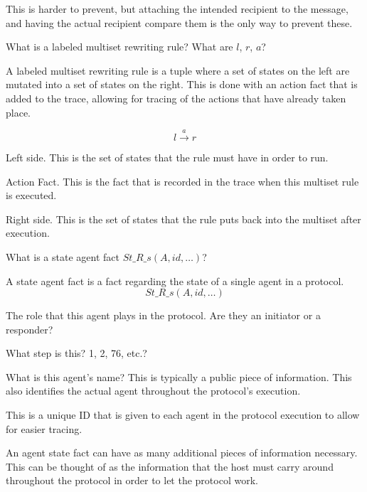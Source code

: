 \begin{questions}
\begin{solution}
    This is harder to prevent, but attaching the intended recipient to the message, and having the actual recipient compare them is the only way to prevent these.
  \end{solution}

\question{} What is a labeled multiset rewriting rule? What are $l$, $r$, $a$?
  \begin{solution}
    A labeled multiset rewriting rule is a tuple where a set of states on the left are mutated into a set of states on the right.
    This is done with an action fact that is added to the trace, allowing for tracing of the actions that have already taken place.

    \begin{equation}\label{eq:Labeled_Multiset_Rewriting_Rule}
      l \overset{a}{\to} r
    \end{equation}
    \begin{description}[noitemsep]
    \item[$l$] Left side. This is the set of states that the rule must have in order to run.
    \item[$a$] Action Fact. This is the fact that is recorded in the trace when this multiset rule is executed.
    \item[$r$] Right side. This is the set of states that the rule puts back into the multiset after execution.
    \end{description}
  \end{solution}

\question{} What is a state agent fact $St\_R\_s(A, id, \ldots)$?
  \begin{solution}
    A state agent fact is a fact regarding the state of a single agent in a protocol.
    \begin{equation}\label{eq:State_Agent_Fact}
      St\_R\_s(A, id, \ldots)
    \end{equation}
    \begin{description}[noitemsep]
    \item[$R$] The role that this agent plays in the protocol. Are they an initiator or a responder?
    \item[$s$] What step is this? 1, 2, 76, etc.?
    \item[$A$] What is this agent's name? This is typically a public piece of information.
      This also identifies the actual agent throughout the protocol's execution.
    \item[$id$] This is a unique ID that is given to each agent in the protocol execution to allow for easier tracing.
    \item[$\ldots$] An agent state fact can have as many additional pieces of information necessary.
      This can be thought of as the information that the host must carry around throughout the protocol in order to let the protocol work.
    \end{description}
  \end{solution}


\end{questions}
